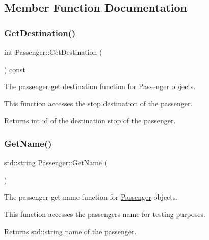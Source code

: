 \subsection{Member Function Documentation}
\mbox{\label{classPassenger_a49db0ee527377aae6077df190a11501c}} 
\subsubsection{\texorpdfstring{Get\+Destination()}{GetDestination()}}
{\footnotesize\ttfamily int Passenger\+::\+Get\+Destination (\begin{DoxyParamCaption}{ }\end{DoxyParamCaption}) const}



The passenger get destination function for \hyperlink{classPassenger}{Passenger} objects. 

This function accesses the stop destination of the passenger.

\begin{DoxyReturn}{Returns}
int id of the destination stop of the passenger. 
\end{DoxyReturn}
\mbox{\label{classPassenger_ad186ef0e9d198895eaa2b14c66869e2b}} 
\subsubsection{\texorpdfstring{Get\+Name()}{GetName()}}
{\footnotesize\ttfamily std\+::string Passenger\+::\+Get\+Name (\begin{DoxyParamCaption}{ }\end{DoxyParamCaption})}



The passenger get name function for \hyperlink{classPassenger}{Passenger} objects. 

This function accesses the passenger\textquotesingle{}s name for testing purposes.

\begin{DoxyReturn}{Returns}
std\+::string name of the passenger. 
\end{DoxyReturn}
\mbox{\label{classPassenger_a3cabb05dbf0c185e123f8d03368ed4f1}} 

